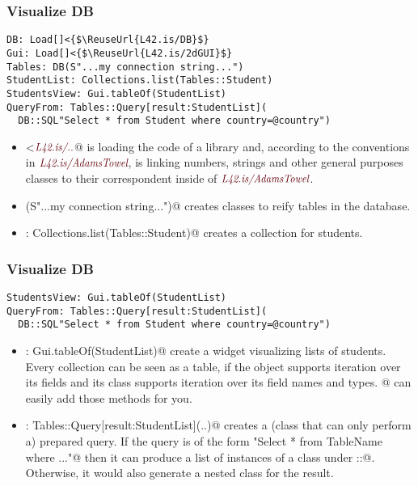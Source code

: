 \begin{frame}[fragile]
\frametitle{Visualize DB}
\begin{NiceCode}{59ex}{1}
\begin{lstlisting}
DB: Load[]<{$\ReuseUrl{L42.is/DB}$}
Gui: Load[]<{$\ReuseUrl{L42.is/2dGUI}$}
Tables: DB(S"...my connection string...")
StudentList: Collections.list(Tables::Student)
StudentsView: Gui.tableOf(StudentList)
QueryFrom: Tables::Query[result:StudentList](
  DB::SQL"Select * from Student where country=@country")
\end{lstlisting}
\end{NiceCode}
\begin{itemize}
\item \Q@Load[]<{$\ReuseUrl{L42.is/..}$}@
\Q@Load@ is loading the code of a library
and, according to the conventions in 
$\ReuseUrl{L42.is/AdamsTowel}$, is linking numbers, strings
and other general purposes classes to their correspondent 
inside of $\ReuseUrl{L42.is/AdamsTowel}$.
\item \Q@DB(S"...my connection string...")@
creates classes to reify tables in the database.
\item \Q@StudentList: Collections.list(Tables::Student)@
creates a collection for students.
\end{itemize}
\end{frame}


\begin{frame}[fragile]
\frametitle{Visualize DB}
\begin{NiceCode}{59ex}{1}
\begin{lstlisting}
StudentsView: Gui.tableOf(StudentList)
QueryFrom: Tables::Query[result:StudentList](
  DB::SQL"Select * from Student where country=@country")
\end{lstlisting}
\end{NiceCode}
\begin{itemize}
\item \Q@StudentsView: Gui.tableOf(StudentList)@
create a widget visualizing lists of students.
Every collection can be seen as a table, if the object supports
iteration over its fields and its class supports iteration over its field names and types.
\Q@Data[]@ can easily add those methods for you.
\item \Q@QueryFrom: Tables::Query[result:StudentList](..)@
creates a (class that can only perform a) prepared query.
If the query is of the form \Q@"Select * from TableName where ..."@ then
it can produce a list of instances of a class under \Q@Table::@.
Otherwise, it would also generate a nested class for the result.
\end{itemize}
\end{frame}

